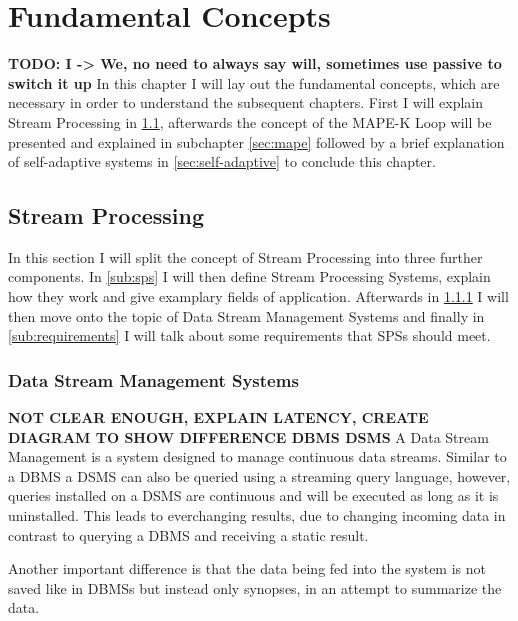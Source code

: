 \chapter{Fundamental Concepts}
\label{cha:fundamentals}
\textbf{TODO: I -> We, no need to always say will, sometimes use passive to switch it up}
In this chapter I will lay out the fundamental concepts, which are necessary in order to understand the subsequent chapters.
First I will explain Stream Processing in \ref{sec:stream-processing}, afterwards the concept of the MAPE-K Loop will be presented and explained in subchapter \ref{sec:mape} 
followed by a brief explanation of self-adaptive systems in \ref{sec:self-adaptive} to conclude this chapter.

    \section{Stream Processing}
    \label{sec:stream-processing}
    In this section I will split the concept of Stream Processing into three further components.
    In \ref{sub:sps} I will then define Stream Processing Systems, explain how they work and give examplary fields of application.
    Afterwards in \ref{sub:dsms} I will then move onto the topic of Data Stream Management Systems and finally in \ref{sub:requirements} I will talk about
    some requirements that SPSs should meet.
    

        \subsection{Data Stream Management Systems}
        \label{sub:dsms}
        \textbf{NOT CLEAR ENOUGH, EXPLAIN LATENCY, CREATE DIAGRAM TO SHOW DIFFERENCE DBMS DSMS}
        A Data Stream Management is a system designed to manage continuous data streams.
        Similar to a DBMS a DSMS can also be queried using a streaming query language, however, queries installed on a DSMS are continuous 
        and will be executed as long as it is uninstalled.
        This leads to everchanging results, due to changing incoming data in contrast to querying a DBMS and receiving a static result.
        
        Another important difference is that the data being fed into the system is not saved like in DBMSs but instead only synopses, in 
        an attempt to summarize the data.
        

